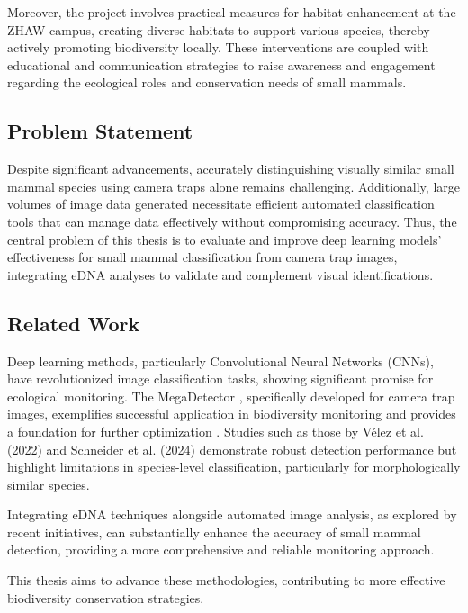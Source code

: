 Moreover, the project involves practical measures for habitat enhancement at the ZHAW campus, creating diverse habitats to support various species, thereby actively promoting biodiversity locally.
These interventions are coupled with educational and communication strategies to raise awareness and engagement regarding the ecological roles and conservation needs of small mammals.

\subsection{Problem Statement}

Despite significant advancements, accurately distinguishing visually similar small mammal species using camera traps alone remains challenging.
Additionally, large volumes of image data generated necessitate efficient automated classification tools that can manage data effectively without compromising accuracy.
Thus, the central problem of this thesis is to evaluate and improve deep learning models' effectiveness for small mammal classification from camera trap images, integrating eDNA analyses to validate and complement visual identifications.

\subsection{Related Work}

Deep learning methods, particularly Convolutional Neural Networks (CNNs), have revolutionized image classification tasks, showing significant promise for ecological monitoring.
The MegaDetector \autocite{morrisEfficientPipelineCamera2025}, specifically developed for camera trap images, exemplifies successful application in biodiversity monitoring and provides a foundation for further optimization \autocite{hernandezPytorchWildlifeCollaborativeDeep2024, velezChoosingAppropriatePlatform2022, schneiderRecognitionEuropeanMammals2024}.
Studies such as those by Vélez et al. (2022) and Schneider et al. (2024) demonstrate robust detection performance but highlight limitations in species-level classification, particularly for morphologically similar species.

Integrating eDNA techniques alongside automated image analysis, as explored by recent initiatives, can substantially enhance the accuracy of small mammal detection, providing a more comprehensive and reliable monitoring approach.

This thesis aims to advance these methodologies, contributing to more effective biodiversity conservation strategies.
